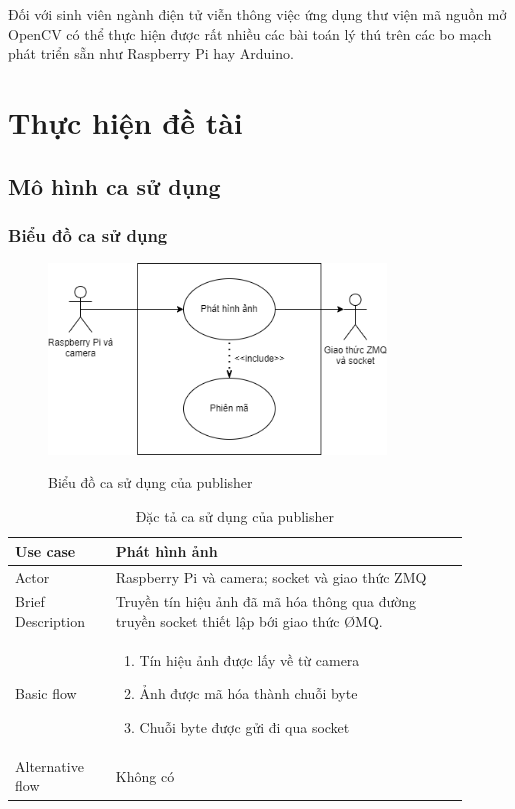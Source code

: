 \documentclass{article}
\begin{document}
Đối với sinh viên ngành điện tử viễn thông việc ứng dụng thư viện mã nguồn mở OpenCV có thể thực hiện được rất nhiều các bài toán lý thú trên các bo mạch phát triển sẵn như Raspberry Pi hay Arduino.

\newpage

\section{Thực hiện đề tài}

\subsection{Mô hình ca sử dụng}

\subsubsection{Biểu đồ ca sử dụng}

\begin{figure}[ht]
\centering
\includegraphics[width=0.8\textwidth]{publisher.png}
\label{pub_fig}
\caption{Biểu đồ ca sử dụng của publisher}
\end{figure}

\begin{table}[h]
    \centering
    \begin{tabular}{|p{0.2\linewidth}|p{0.7\linewidth}|}
    \hline
        Use case &  Phát hình ảnh\\
        \hline
        Actor &  Raspberry Pi và camera; socket và giao thức ZMQ\\ 
        \hline
        Brief Description &  Truyền tín hiệu ảnh đã mã hóa thông qua đường truyền socket thiết lập bới giao thức \O MQ. \\
        \hline
        Basic flow & \begin{enumerate}
            \item Tín hiệu ảnh được lấy về từ camera
            \item Ảnh được mã hóa thành chuỗi byte
            \item Chuỗi byte được gửi đi qua socket
        \end{enumerate}\\
        \hline
        Alternative flow &  Không có\\
        \hline
    \end{tabular}
    \caption{Đặc tả ca sử dụng của publisher}
    \label{table2}
\end{table}
\end{document}
